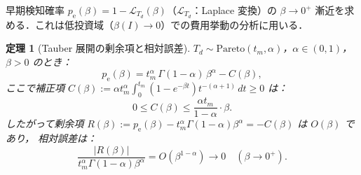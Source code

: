 \documentclass[12pt,a4paper]{article}
\theoremstyle{plain}
\newtheorem{theorem}{定理}[section]
\theoremstyle{definition}
\theoremstyle{remark}
\newcommand{\calL}{\mathcal{L}}
\newcommand{\pe}{p_{\mathrm{e}}}
\newcommand{\betaI}{\beta(I)}
\begin{document}
早期検知確率 $\pe(\beta)=1-\calL_{T_d}(\beta)$（$\calL_{T_d}$：Laplace 変換）の
$\beta\to0^+$ 漸近を求める．これは低投資域（$\betaI\to0$）での費用挙動の分析に用いる．

\begin{theorem}[Tauber 展開の剰余項と相対誤差]\label{thm:remainder}
$T_d\sim\mathrm{Pareto}(t_m,\alpha)$，$\alpha\in(0,1)$，$\beta>0$ のとき：
\begin{equation}\label{eq:pe_tauber}
\pe(\beta)=t_m^\alpha\,\Gamma(1-\alpha)\,\beta^\alpha - C(\beta),
\end{equation}
ここで補正項 $C(\beta):=\alpha t_m^\alpha\int_0^{t_m}(1-e^{-\beta t})t^{-(\alpha+1)}\,dt\ge0$ は：
\begin{equation}\label{eq:C_bound}
0\le C(\beta)\le\frac{\alpha t_m}{1-\alpha}\cdot\beta.
\end{equation}
したがって剰余項 $R(\beta):=\pe(\beta)-t_m^\alpha\Gamma(1-\alpha)\beta^\alpha=-C(\beta)$ は $O(\beta)$ であり，
相対誤差は：
\[
\frac{|R(\beta)|}{t_m^\alpha\Gamma(1-\alpha)\beta^\alpha}
=O(\beta^{1-\alpha})\to0\quad(\beta\to0^+).
\]
\end{theorem}
\end{document}
